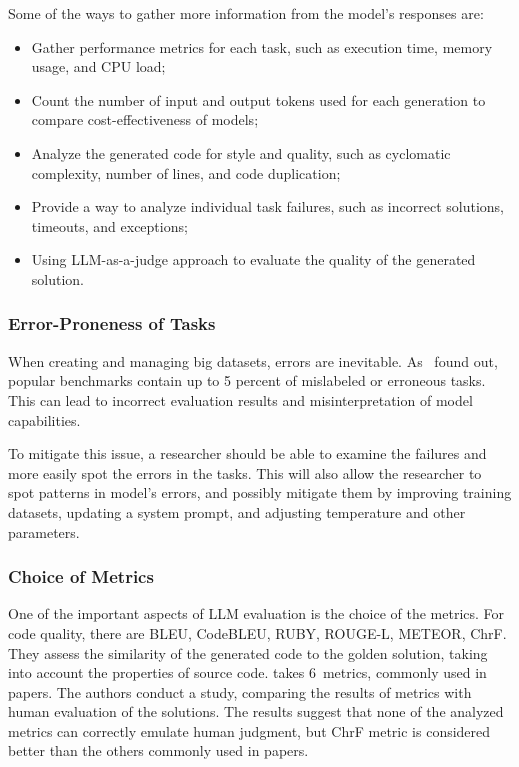 Some of the ways to gather more information from the model's responses are:
\begin{itemize}
    \item Gather performance metrics for each task, such as execution time, memory usage, and CPU load;
    \item Count the number of input and output tokens used for each generation to compare cost-effectiveness of models;
    \item Analyze the generated code for style and quality, such as cyclomatic complexity, number of lines, and code duplication;
    \item Provide a way to analyze individual task failures, such as incorrect solutions, timeouts, and exceptions;
    \item Using LLM-as-a-judge approach to evaluate the quality of the generated solution.
\end{itemize}

\subsubsection{Error-Proneness of Tasks}

When creating and managing big datasets, errors are inevitable.
As~\cite{vendrow2025largelanguagemodelbenchmarks} found out, popular benchmarks contain up to 5 percent of mislabeled or erroneous tasks.
This can lead to incorrect evaluation results and misinterpretation of model capabilities.

To mitigate this issue, a researcher should be able to examine the failures and more easily spot the errors in the tasks.
This will also allow the researcher to spot patterns in model's errors, and possibly mitigate them by improving training datasets, updating a system prompt, and adjusting temperature and other parameters.

\subsubsection{Choice of Metrics}
One of the important aspects of LLM evaluation is the choice of the metrics.
For code quality, there are BLEU, CodeBLEU, RUBY, ROUGE-L, METEOR, ChrF\@.
They assess the similarity of the generated code to the golden solution, taking into account the properties of source code.
\cite{evtikhiev2023out} takes 6~metrics, commonly used in papers.
The authors conduct a study, comparing the results of metrics with human evaluation of the solutions.
The results suggest that none of the analyzed metrics can correctly emulate human judgment, but ChrF metric is considered better than the others commonly used in papers.


